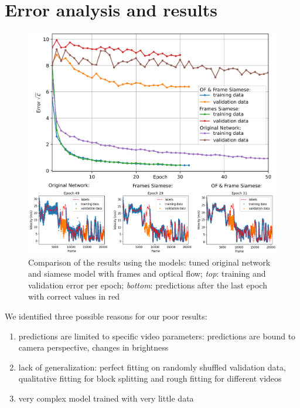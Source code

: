 \documentclass[conference]{IEEEtran}
\begin{document}
\section{Error analysis and results}

\begin{figure}[ht]
	\centering
	\includegraphics[width=0.99\columnwidth]{imgs/TrainingProcess.eps}
	\caption{Comparison of the results using the models: tuned original network and siamese model with frames and optical flow; \textit{top}: training and validation error per epoch; \textit{bottom}: predictions after the last epoch with correct values in red}
	\label{fig:resultsSummary}
\end{figure}

We identified three possible reasons for our poor results:
\begin{enumerate}[label=(\roman*)]
	\item predictions are limited to specific video parameters: predictions are bound to camera perspective, changes in brightness
	\item lack of generalization: perfect fitting on randomly shuffled validation data, qualitative fitting for block splitting and rough fitting for different videos
	\item very complex model trained with very little data
\end{enumerate}
\end{document}
